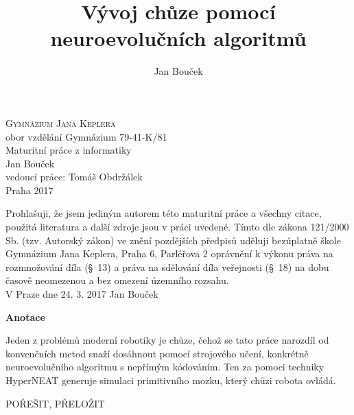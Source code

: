 \documentclass[a4]{article}
\begin{document}
 
 
\begin{titlepage} 
\begin{center} 
{\huge\textsc{Gymnázium Jana Keplera}\\} 
{\large{obor vzdělání Gymnázium 79-41-K/81}\\[0.7cm]} 
{\Huge{Maturitní práce z informatiky}\\[0.5cm]} 
{\Large{Jan Bouček}\\} 
{\large{vedoucí práce: Tomáš Obdržálek}\\} 
{\large{Praha 2017}} 
\end{center} 
\end{titlepage} 
 
\newpage 
Prohlašuji, že jsem jediným autorem této maturitní práce a všechny citace, použitá literatura a další zdroje jsou v práci uvedené. Tímto dle zákona 121/2000 Sb. (tzv. Autorský zákon) ve znění pozdějších předpisů uděluji bezúplatně škole Gymnázium Jana Keplera, Praha 6, Parléřova 2 oprávnění k výkonu práva na rozmnožování díla (§~13) a práva na sdělování díla veřejnosti (§~18) na dobu časově neomezenou a bez omezení územního rozsahu.\\[0.7cm] 
\vspace{10cm} 
{\large{V Praze dne 24. 3. 2017} \hfill Jan Bouček} 
\newpage 
\tableofcontents
\newpage
{\Large\textbf{Anotace}\par}
Jeden z problémů moderní robotiky je chůze, čehož se tato práce narozdíl od konvenčních metod snaží dosáhnout pomocí strojového učení, konkrétně neuroevolučního algoritmu s nepřímým kódováním. Ten za pomoci techniky HyperNEAT generuje simulaci primitivního mozku, který chůzi robota ovládá.\par 
 
{\Huge{POŘEŠIT, PŘELOŽIT}} 
\title{Vývoj chůze pomocí neuroevolučních algoritmů} 
\author{Jan Bouček} 
\date{} 
\maketitle 
 
\end{document}
